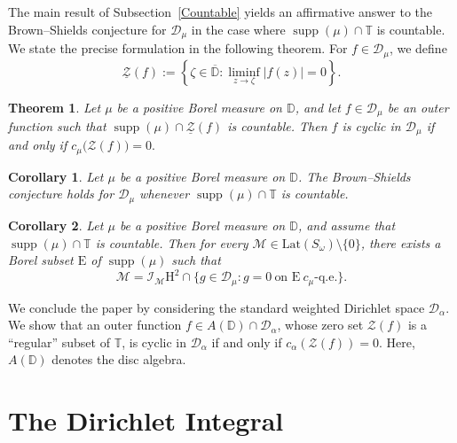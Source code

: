 \documentclass[12pt,reqno,a4paper]{amsart}
\newtheorem{theor}{Theorem }
\newtheorem{coro}{Corollary}
\newcommand{\Lat}{\mathrm{Lat}}
\newcommand{\cM}{{\mathcal{M}}}
\newcommand{\hH}{\mathrm{H^2 }}
\newcommand{\Ee}{\mathrm{E}}
\newcommand\TT{\mathbb{T}}
\newcommand\DD{\mathbb{D}}
\DeclareMathOperator{\supp}{supp}
\newcommand{\cI}{{\mathcal{I}}}
\newcommand{\cD}{{\mathcal{D}}}
\numberwithin{equation}{section}
\begin{document}
The main result of Subsection~\ref{Countable} yields an affirmative answer to the Brown--Shields conjecture for $\mathcal{D}_\mu$ in the case where $\operatorname{supp}(\mu)\cap\mathbb{T}$ is countable. We state the precise formulation in the following theorem.
For \( f \in \mathcal{D}_\mu \), we define
\[
\underline{\mathcal{Z}}(f)
:= \left\{ \zeta \in \overline{\mathbb{D}} : \liminf_{z \to \zeta} |f(z)| = 0 \right\}.
\]
\begin{theor}\label{theo61}
	Let $\mu$ be a positive Borel measure on $\DD$, and let
	$f\in\mathcal D_\mu$ be an outer function such that
	$\operatorname{supp}(\mu)\cap \underline{\mathcal Z}(f)$ is countable.
	Then $f$ is cyclic in $\mathcal D_\mu$ if and only if
	\(
	c_\mu\bigl(\mathcal Z(f)\bigr)=0.
	\)
\end{theor}
\begin{coro}
	Let $\mu$ be a positive Borel measure on $\mathbb{D}$. The Brown--Shields conjecture holds for $\mathcal{D}_\mu$ whenever $\operatorname{supp}(\mu)\cap \mathbb{T}$ is countable.
\end{coro}

\begin{coro}
	Let \(\mu\) be a positive Borel measure on \(\DD\), and assume that \(\supp(\mu) \cap \TT\) is countable. Then for every \(\cM\in \Lat(S_\omega)\setminus\{0\}\), there exists a Borel subset \(\Ee\) of \(\supp(\mu)\) such that 
	$$
	\cM = \cI_\cM \hH \cap \{ g \in \mathcal{D}_\mu : g = 0 \ \text{on } \Ee \ \text{$c_\mu$-q.e.} \}.
	$$
\end{coro}
We conclude the paper by considering the standard weighted Dirichlet space $\mathcal{D}_\alpha$. We show that an outer function $f \in A(\mathbb{D}) \cap \mathcal{D}_\alpha$, whose zero set $\mathcal{Z}(f)$ is a ``regular'' subset of $\mathbb{T}$, is cyclic in $\mathcal{D}_\alpha$ if and only if $c_{\alpha}(\mathcal{Z}(f)) = 0$. Here, $A(\mathbb{D})$ denotes the disc algebra.



\section{The Dirichlet Integral}
\end{document}

